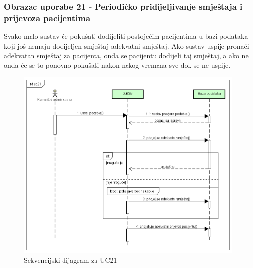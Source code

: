 			\subsubsection{Obrazac uporabe 21 - Periodičko pridijeljivanje smještaja i prijevoza pacijentima}
			Svako malo sustav će pokušati dodijeliti postojećim pacijentima u bazi podataka koji još nemaju dodijeljen smještaj adekvatni smještaj. Ako sustav uspije pronaći adekvatan smještaj za pacijenta, onda se pacijentu dodijeli taj smještaj, a ako ne onda će se to ponovno pokušati nakon nekog vremena sve dok se ne uspije.
			\begin{figure}[H]
				\centering
				\includegraphics[width=\textwidth]{slike/uc21.png} %
				\caption{Sekvencijski dijagram za UC21}
				\label{fig:Sekvencijski dijagram za UC21}
			\end{figure}
			\eject		
			
